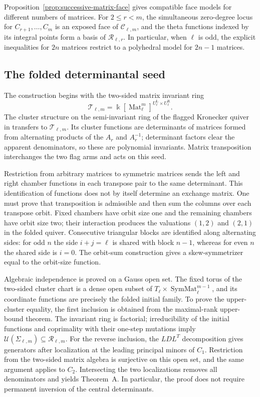 \documentclass[11pt]{amsart}
\theoremstyle{definition}
\theoremstyle{remark}
\newcommand{\kk}{\Bbbk}
\newcommand{\SymMat}{\operatorname{SymMat}}
\newcommand{\cR}{\mathcal R}
\newcommand{\cT}{\mathcal T}
\newcommand{\Mat}{\operatorname{Mat}}
\begin{document}
Proposition~\ref{prop:successive-matrix-face} gives compatible face
models for different numbers of matrices.  For $2\le r<m$, the
simultaneous zero-degree locus for $C_{r+1},\ldots,C_m$ is an exposed face
of $\mathscr C_{\ell,m}$, and the theta functions indexed by its integral
points form a basis of $\cR_{\ell,r}$.  In particular, when $\ell$ is
odd, the explicit inequalities for $2n$ matrices restrict to a polyhedral
model for $2n-1$ matrices.

\subsection{The folded determinantal seed}

The construction begins with the two-sided matrix invariant ring
\[ \cT_{\ell,m} =\kk[\Mat_\ell^m]^{U_\ell^{\mathrm L}\times U_\ell^{\mathrm R}}. \]
The cluster structure on the semi-invariant ring of the flagged Kronecker
quiver in \cite{FeiKroneckerII} transfers to $\cT_{\ell,m}$.  Its cluster
functions are determinants of matrices formed from alternating products of
the $A_r$ and $A_r^{-1}$; determinant factors clear the apparent
denominators, so these are polynomial invariants.  Matrix transposition
interchanges the two flag arms and acts on this seed.

Restriction from arbitrary matrices to symmetric matrices sends the left
and right chamber functions in each transpose pair to the same determinant.
This identification of functions does not by itself determine an exchange
matrix.  One must prove that transposition is admissible and then sum the
columns over each transpose orbit.  Fixed chambers have orbit size one and
the remaining chambers have orbit size two; their interaction produces the
valuations $(1,2)$ and $(2,1)$ in the folded quiver.  Consecutive triangular
blocks are identified along alternating sides: for odd $n$ the side
$i+j=\ell$ is shared with block $n-1$, whereas for even $n$ the shared side
is $i=0$.  The orbit-sum construction gives a skew-symmetrizer equal to the
orbit-size function.

Algebraic independence is proved on a Gauss open set.  The fixed torus of
the two-sided cluster chart is a dense open subset of
$T_\ell\times\SymMat_\ell^{m-1}$, and its coordinate functions are precisely
the folded initial family.  To prove the upper-cluster equality, the first
inclusion is obtained from the maximal-rank upper-bound theorem.  The
invariant ring is factorial; irreducibility of the initial functions and
coprimality with their one-step mutations imply
$\mathcal U(\Sigma_{\ell,m})\subseteq\cR_{\ell,m}$.  For the reverse
inclusion, the $LDL^T$ decomposition gives generators after localization at
the leading principal minors of $C_1$.  Restriction from the two-sided
matrix algebra is surjective on this open set, and the same argument applies
to $C_2$.  Intersecting the two localizations removes all denominators and
yields Theorem~A.  In particular, the proof does not require permanent
inversion of the central determinants.
\end{document}
